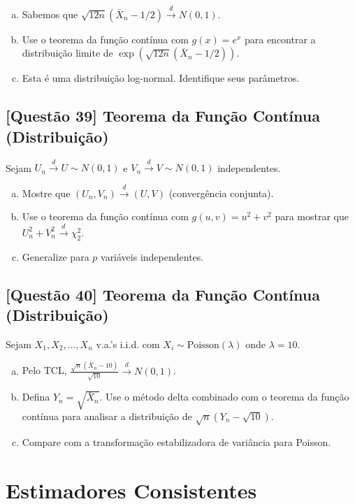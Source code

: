 \documentclass[12pt,a4paper]{article}
\begin{document}
\begin{enumerate}[(a)]
    \item Sabemos que $\sqrt{12n}(\bar{X}_n - 1/2) \xrightarrow{d} N(0,1)$.
    \item Use o teorema da função contínua com $g(x) = e^x$ para encontrar a distribuição limite de $\exp(\sqrt{12n}(\bar{X}_n - 1/2))$.
    \item Esta é uma distribuição log-normal. Identifique seus parâmetros.
\end{enumerate}

\subsection*{[Questão 39] Teorema da Função Contínua (Distribuição)}

Sejam $U_n \xrightarrow{d} U \sim N(0,1)$ e $V_n \xrightarrow{d} V \sim N(0,1)$ independentes.

\begin{enumerate}[(a)]
    \item Mostre que $(U_n, V_n) \xrightarrow{d} (U, V)$ (convergência conjunta).
    \item Use o teorema da função contínua com $g(u,v) = u^2 + v^2$ para mostrar que $U_n^2 + V_n^2 \xrightarrow{d} \chi^2_2$.
    \item Generalize para $p$ variáveis independentes.
\end{enumerate}

\subsection*{[Questão 40] Teorema da Função Contínua (Distribuição)}

Sejam $X_1, X_2, \ldots, X_n$ v.a.'s i.i.d. com $X_i \sim \text{Poisson}(\lambda)$ onde $\lambda = 10$.

\begin{enumerate}[(a)]
    \item Pelo TCL, $\frac{\sqrt{n}(\bar{X}_n - 10)}{\sqrt{10}} \xrightarrow{d} N(0,1)$.
    \item Defina $Y_n = \sqrt{\bar{X}_n}$. Use o método delta combinado com o teorema da função contínua para analisar a distribuição de $\sqrt{n}(Y_n - \sqrt{10})$.
    \item Compare com a transformação estabilizadora de variância para Poisson.
\end{enumerate}

\section{Estimadores Consistentes}
\end{document}
